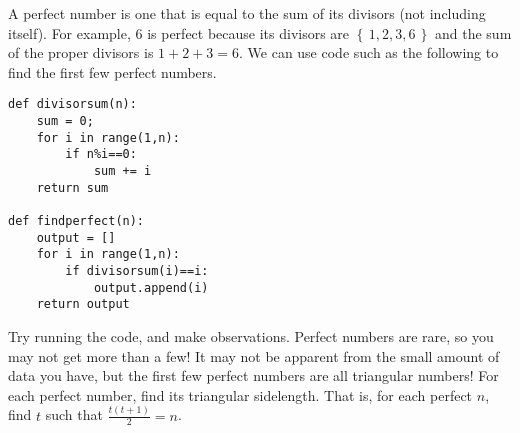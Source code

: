 \documentclass[12pt]{exam}
\newcommand{\set}[1]{\left\{\,#1\,\right\}}
\begin{document}
\begin{questions}
  \question A perfect number is one that is equal to the sum of its divisors (not including itself). For example, 6 is perfect because its divisors are $\set{1,2,3,6}$ and the sum of the proper divisors is $1+2+3=6$. We can use code such as the following to find the first few perfect numbers.
  
  \begin{lstlisting}
def divisorsum(n):
    sum = 0;
    for i in range(1,n):
        if n%i==0:
            sum += i
    return sum

def findperfect(n):
    output = []
    for i in range(1,n):
        if divisorsum(i)==i:
            output.append(i)
    return output
  \end{lstlisting}
  
  Try running the code, and make observations. Perfect numbers are rare, so you may not get more than a few!
  \newpage
  \question It may not be apparent from the small amount of data you have, but the first few perfect numbers are all triangular numbers! For each perfect number, find its triangular sidelength. That is, for each perfect $n$, find $t$ such that $\frac{t(t+1)}{2}=n$.
  \begin{center}
  \end{center}
  \newpage
  \question 
\end{questions}
\end{document}
